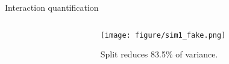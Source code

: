 \documentclass[11pt,compress,t,notes=noshow, aspectratio=169, xcolor=table,dvipsnames]{beamer}
\begin{document}
\begin{frame}{Interaction quantification}
\begin{columns}[T, totalwidth=\textwidth]
\begin{column}{0.59\textwidth}
\begin{center}
{}

\end{center}
    \end{column}
\pause
    \begin{column}{0.4\textwidth}
 \centering
\texttt{[image: figure/sim1\_fake.png]}

Split reduces 83.5\% of variance.
    \end{column}
\end{columns}

\end{frame}
\end{document}
